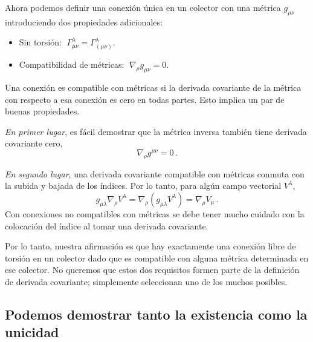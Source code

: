 \documentclass[11pt,b5paper,openany,twoside]{book}
\newcommand{\mn}{{\mu\nu}}
\begin{document}
Ahora podemos definir una conexión única en un colector con una métrica $g_\mn$ introduciendo dos propiedades adicionales:

\begin{itemize}
\item Sin torsión: $\;\Gamma^\lambda_{\mu\nu}= \Gamma^\lambda_{(\mu\nu)}$.
\item Compatibilidad de métricas: $\;\nabla_\rho g_\mn=0$.
\end{itemize}

\noindent
Una conexión es compatible con métricas si la derivada covariante de la métrica con respecto a esa conexión es cero en todas partes.
Esto implica un par de buenas propiedades.

\textit{En primer lugar},\; es fácil demostrar que la métrica inversa también tiene derivada covariante cero,
\begin{equation}
\nabla_\rho g^\mn = 0\,.\label{3.17}
\end{equation}

\textit{En segundo lugar},\; una derivada covariante compatible con métricas conmuta con la subida y bajada de los índices.
Por lo tanto, para algún campo vectorial $V^\lambda$,
\begin{equation}
g_{\mu\lambda}\nabla_\rho V^\lambda = \nabla_\rho
(g_{\mu\lambda} V^\lambda) = \nabla_\rho V_\mu\,.\label{3.18}
\end{equation}
Con conexiones no compatibles con métricas se debe tener mucho cuidado con la colocación del índice al tomar una derivada covariante.

Por lo tanto, nuestra afirmación es que hay exactamente una conexión libre de torsión en un colector dado que es compatible con alguna métrica determinada en ese colector.
No queremos que estos dos requisitos formen parte de la definición de derivada covariante; simplemente seleccionan uno de los muchos posibles.

\subsection{Podemos demostrar tanto la existencia como la unicidad}
\end{document}
